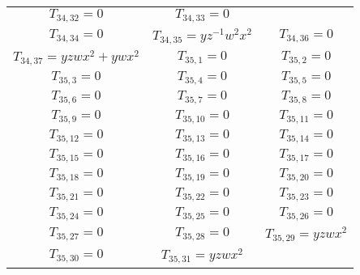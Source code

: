 \documentclass[12pt]{memoireuqam1.3}
\begin{document}
\begin{longtable}{|c|c|c|}
$T_{34,32}= 0$&

$T_{34,33}= 0$\\

$T_{34,34}= 0$&

$T_{34,35}= yz^{-1}w^2x^2$&

$T_{34,36}= 0$\\

$T_{34,37}= yzwx^2+ywx^2$&

$T_{35,1}= 0$&

$T_{35,2}= 0$\\

$T_{35,3}= 0$&

$T_{35,4}= 0$&

$T_{35,5}= 0$\\

$T_{35,6}= 0$&

$T_{35,7}= 0$&

$T_{35,8}= 0$\\

$T_{35,9}= 0$&

$T_{35,10}= 0$&

$T_{35,11}= 0$\\

$T_{35,12}= 0$&

$T_{35,13}= 0$&

$T_{35,14}= 0$\\

$T_{35,15}= 0$&

$T_{35,16}= 0$&

$T_{35,17}= 0$\\

$T_{35,18}= 0$&

$T_{35,19}= 0$&

$T_{35,20}= 0$\\

$T_{35,21}= 0$&

$T_{35,22}= 0$&

$T_{35,23}= 0$\\

$T_{35,24}= 0$&

$T_{35,25}= 0$&

$T_{35,26}= 0$\\

$T_{35,27}= 0$&

$T_{35,28}= 0$&

$T_{35,29}= yzwx^2$\\

$T_{35,30}= 0$&

$T_{35,31}= yzwx^2$&


\end{longtable}
\end{document}
